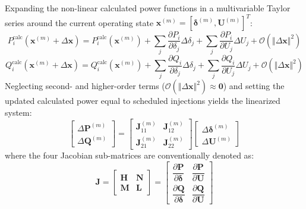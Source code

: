 \documentclass[12pt,a4paper,oneside]{report}
\begin{document}
Expanding the non-linear calculated power functions in a multivariable Taylor series around the current operating state $\mathbf{x}^{(m)} = [\boldsymbol{\delta}^{(m)}, \mathbf{U}^{(m)}]^T$:
\begin{equation}
P_i^{\text{calc}}(\mathbf{x}^{(m)} + \Delta \mathbf{x}) = P_i^{\text{calc}}(\mathbf{x}^{(m)}) + \sum_{j} \frac{\partial P_i}{\partial \delta_j} \Delta \delta_j + \sum_{j} \frac{\partial P_i}{\partial U_j} \Delta U_j + \mathcal{O}(\Vert\Delta \mathbf{x}\Vert^2)
\end{equation}
\begin{equation}
Q_i^{\text{calc}}(\mathbf{x}^{(m)} + \Delta \mathbf{x}) = Q_i^{\text{calc}}(\mathbf{x}^{(m)}) + \sum_{j} \frac{\partial Q_i}{\partial \delta_j} \Delta \delta_j + \sum_{j} \frac{\partial Q_i}{\partial U_j} \Delta U_j + \mathcal{O}(\Vert\Delta \mathbf{x}\Vert^2)
\end{equation}
Neglecting second- and higher-order terms ($\mathcal{O}(\Vert\Delta \mathbf{x}\Vert^2) \approx \mathbf{0}$) and setting the updated calculated power equal to scheduled injections yields the linearized system:
\begin{equation}
\begin{bmatrix} \Delta \mathbf{P}^{(m)} \\ \Delta \mathbf{Q}^{(m)} \end{bmatrix} = \begin{bmatrix} \mathbf{J}_{11}^{(m)} & \mathbf{J}_{12}^{(m)} \\ \mathbf{J}_{21}^{(m)} & \mathbf{J}_{22}^{(m)} \end{bmatrix} \begin{bmatrix} \Delta \boldsymbol{\delta}^{(m)} \\ \Delta \mathbf{U}^{(m)} \end{bmatrix}
\end{equation}
where the four Jacobian sub-matrices are conventionally denoted as:
\begin{equation}
\mathbf{J} = \begin{bmatrix} \mathbf{H} & \mathbf{N} \\ \mathbf{M} & \mathbf{L} \end{bmatrix} = \begin{bmatrix} \dfrac{\partial \mathbf{P}}{\partial \boldsymbol{\delta}} & \dfrac{\partial \mathbf{P}}{\partial \mathbf{U}} \\[8pt] \dfrac{\partial \mathbf{Q}}{\partial \boldsymbol{\delta}} & \dfrac{\partial \mathbf{Q}}{\partial \mathbf{U}} \end{bmatrix}
\end{equation}
\end{document}
